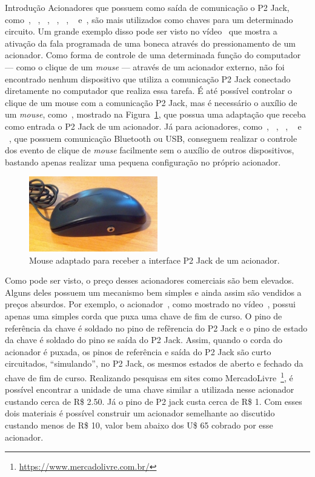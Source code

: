 \begin{chapter}{Introdução}
Acionadores que possuem como saída de comunicação o P2 Jack,
como~\cite{CandyCorn}, ~\cite{PalPad}, ~\cite{JellyBean}, ~\cite{Chin}, ~\cite{
MicroLight}, ~\cite{HoneyBee} e~\cite{StringSwitch}, são mais utilizados como
chaves para um determinado circuito. Um grande exemplo disso pode ser visto no
vídeo~\cite{ATswitchYT} que mostra a ativação da fala programada de uma boneca
através do pressionamento de um acionador. Como forma de controle de uma
determinada função do computador --- como o clique de um \textit{mouse} ---
através de um acionador externo, não foi encontrado nenhum dispositivo que
utiliza a comunicação P2 Jack conectado diretamente no computador que
realiza essa tarefa. É até possível controlar o clique de um mouse com a
comunicação P2 Jack, mas é necessário o auxílio de um \textit{mouse},
como~\cite{MouseJack}, mostrado na Figura~\ref{fig:mouse}, que possua uma
adaptação que receba como entrada o P2 Jack de um acionador. Já para
acionadores, como~\cite{Blue2}, ~\cite{SavantElite2}, ~\cite{FootPedal},
~\cite{FootSwitch} e ~\cite{SipPuff}, que possuem comunicação Bluetooth ou USB, 
conseguem realizar o controle dos evento de
clique de \textit{mouse} facilmente sem o auxílio de outros dispositivos,
bastando apenas realizar uma pequena configuração no próprio acionador.

\begin{figure}[!h]
	\centering
	\includegraphics[width=0.5\textwidth]{fig/mouse13}
	\caption{Mouse adaptado para receber a interface P2 Jack de um acionador.}
	\label{fig:mouse}
\end{figure}

Como pode ser visto, o preço desses acionadores comerciais são bem elevados.
Alguns deles possuem um mecanismo bem simples e ainda assim são vendidos a preços
absurdos. Por exemplo, o acionador~\cite{StringSwitch}, como mostrado no
vídeo~\cite{videoStringSwitch}, possui apenas uma simples corda que puxa uma
chave de fim de curso. O pino de referência da chave é soldado no pino de
refêrencia do P2 Jack e o pino de estado da chave é soldado do pino se saída do
P2 Jack.  Assim, quando o corda do acionador é puxada, os pinos de referência e
saída do P2 Jack são curto circuitados, ``simulando'', no P2 Jack, os mesmos
estados de aberto e fechado da chave de fim de curso. Realizando pesquisas em
sites como MercadoLivre~\footnote{\url{https://www.mercadolivre.com.br/}}, é
possível encontrar a unidade de uma chave similar a utilizada nesse acionador
custando cerca de R\$ 2.50. Já o pino de P2 jack custa cerca de R\$ 1. Com esses
dois materiais é possível construir um acionador semelhante ao discutido
custando menos de R\$ 10, valor bem abaixo dos U\$ 65 cobrado por esse
acionador.


\end{chapter}
